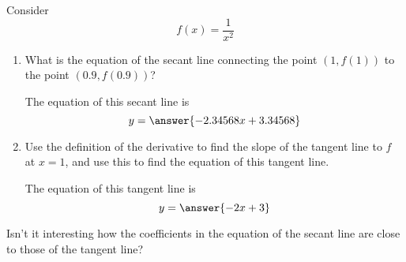 \documentclass{ximera}
\author{Steven Gubkin}
\begin{document}
\begin{exercise}

Consider 
\[
f(x) = \frac{1}{x^2}
\]



\begin{enumerate}
	\item What is the equation of the secant line connecting the point $(1,f(1))$ to the point $(0.9,f(0.9))$? 
		\begin{prompt} 
			The equation of this secant line is
			$$ y = \answer{ -2.34568x+ 3.34568}$$ 
		\end{prompt}

	\item  Use the definition of the derivative to find the slope of the tangent line to $f$ at $x=1$, and use this to find the equation of this tangent line.

		\begin{prompt} 
			The equation of this tangent line is
			$$ y = \answer{ -2x + 3}$$ 
		\end{prompt}

\end{enumerate}

Isn't it interesting how the coefficients in the equation of the secant line are close to those of the tangent line?
\end{exercise}
\end{document}
